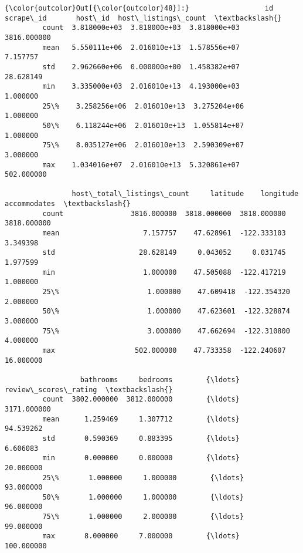 \documentclass[11pt]{article}
\begin{document}
\begin{Verbatim}[commandchars=\\\{\}]
{\color{outcolor}Out[{\color{outcolor}48}]:}                  id     scrape\_id       host\_id  host\_listings\_count  \textbackslash{}
         count  3.818000e+03  3.818000e+03  3.818000e+03          3816.000000   
         mean   5.550111e+06  2.016010e+13  1.578556e+07             7.157757   
         std    2.962660e+06  0.000000e+00  1.458382e+07            28.628149   
         min    3.335000e+03  2.016010e+13  4.193000e+03             1.000000   
         25\%    3.258256e+06  2.016010e+13  3.275204e+06             1.000000   
         50\%    6.118244e+06  2.016010e+13  1.055814e+07             1.000000   
         75\%    8.035127e+06  2.016010e+13  2.590309e+07             3.000000   
         max    1.034016e+07  2.016010e+13  5.320861e+07           502.000000   
         
                host\_total\_listings\_count     latitude    longitude  accommodates  \textbackslash{}
         count                3816.000000  3818.000000  3818.000000   3818.000000   
         mean                    7.157757    47.628961  -122.333103      3.349398   
         std                    28.628149     0.043052     0.031745      1.977599   
         min                     1.000000    47.505088  -122.417219      1.000000   
         25\%                     1.000000    47.609418  -122.354320      2.000000   
         50\%                     1.000000    47.623601  -122.328874      3.000000   
         75\%                     3.000000    47.662694  -122.310800      4.000000   
         max                   502.000000    47.733358  -122.240607     16.000000   
         
                  bathrooms     bedrooms        {\ldots}          review\_scores\_rating  \textbackslash{}
         count  3802.000000  3812.000000        {\ldots}                   3171.000000   
         mean      1.259469     1.307712        {\ldots}                     94.539262   
         std       0.590369     0.883395        {\ldots}                      6.606083   
         min       0.000000     0.000000        {\ldots}                     20.000000   
         25\%       1.000000     1.000000        {\ldots}                     93.000000   
         50\%       1.000000     1.000000        {\ldots}                     96.000000   
         75\%       1.000000     2.000000        {\ldots}                     99.000000   
         max       8.000000     7.000000        {\ldots}                    100.000000   
         

\end{Verbatim}
\end{document}
